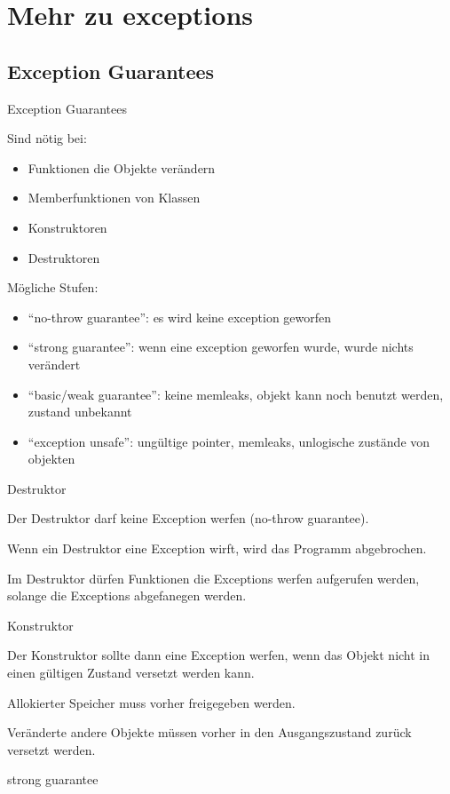 \section{Mehr zu exceptions}


\subsection{Exception Guarantees}


\begin{frame}{Exception Guarantees}

    Sind nötig bei: 
	\begin{itemize}
		\item Funktionen die Objekte verändern
		\item Memberfunktionen von Klassen
		\item Konstruktoren
		\item Destruktoren
	\end{itemize}
	
	Mögliche Stufen:
	\begin{itemize}
			\item \enquote{no-throw guarantee}: es wird keine exception geworfen
			\item \enquote{strong guarantee}: wenn eine exception geworfen wurde, wurde nichts verändert
			\item \enquote{basic/weak guarantee}: keine memleaks, objekt kann noch benutzt werden, zustand unbekannt
			\item \enquote{exception unsafe}: ungültige pointer, memleaks, unlogische zustände von objekten
	\end{itemize}

\end{frame}


\begin{frame}{Destruktor}

    Der Destruktor darf keine Exception werfen (no-throw guarantee).
    
    Wenn ein Destruktor eine Exception wirft, wird das Programm abgebrochen.
    
    Im Destruktor dürfen Funktionen die Exceptions werfen aufgerufen werden, solange die Exceptions abgefanegen werden.

\end{frame}

\begin{frame}{Konstruktor}

    Der Konstruktor sollte dann eine Exception werfen, wenn das Objekt nicht in einen gültigen Zustand versetzt werden kann.
    
    Allokierter Speicher muss vorher freigegeben werden.
    
    Veränderte andere Objekte müssen vorher in den Ausgangszustand zurück versetzt werden.
    
    strong guarantee
    

\end{frame}

